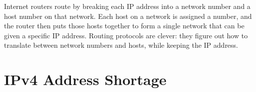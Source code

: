 \documentclass[conference]{IEEEtran}
\begin{document}
Internet routers route by breaking each IP address into a network number and a host number on that network. Each host on a network is assigned a number, and the router then puts those hosts together to form a single network that can be given a specific IP address. Routing protocols are clever: they figure out how to translate between network numbers and hosts, while keeping the IP address.

\section{IPv4 Address Shortage}
\end{document}
